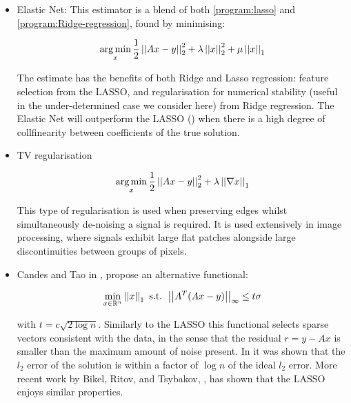 \begin{itemize}
\item Elastic Net: This estimator is a blend of both \eqref{program:lasso} and \eqref{program:Ridge-regression}, found by minimising:

\begin{equation}
\operatorname*{arg\,min}_x \frac{1}{2}\left|\left|Ax-y\right|\right|_2^2 + \lambda\left|\left|x\right|\right|_2^2 + \mu\left|\left|x\right|\right|_1
\label{program:enat}
\end{equation}

The estimate has the benefits of both Ridge and Lasso regression: feature selection from the LASSO, and regularisation for numerical stability (useful in the under-determined case we consider here) from Ridge regression. The Elastic Net will outperform the LASSO (\cite{zou2005regularization}) when there is a high degree of collfinearity between coefficients of the true solution.

\item TV regularisation

\begin{equation}
\operatorname*{arg\,min}_x \frac{1}{2}\left|\left|Ax-y\right|\right|_2^2 +  \lambda\left|\left|\nabla x\right|\right|_1
\label{program:tc}
\end{equation}

This type of regularisation is used when preserving edges whilst simultaneously de-noising a signal is required. It is used extensively in image processing, where signals exhibit large flat patches alongside large discontinuities between groups of pixels.

\item Candes and Tao in \cite{candes2007dantzig}, propose an alternative  functional:

\begin{equation}
\min_{x \in {\mathbb{R}}^n} \left|\left|x\right|\right|_1 \text{ s.t. } \left|\left|A^T(Ax-y)\right|\right|_{\infty} \leq t\sigma
\label{program:danzig}
\end{equation}

with \(t = c\sqrt{2\log{n}}\). Similarly to the LASSO this functional selects sparse vectors consistent with the data, in the sense that the residual \(r = y - Ax\) is smaller than the maximum amount of noise present. In \cite{candes2007dantzig} it was shown that the \(l_2\) error of the solution is within a factor of \(\log{n}\) of the ideal \(l_2\) error. More recent work by Bikel, Ritov, and Tsybakov, \cite{bickel2009simultaneous}, has shown that the LASSO enjoys similar properties.
\end{itemize}

